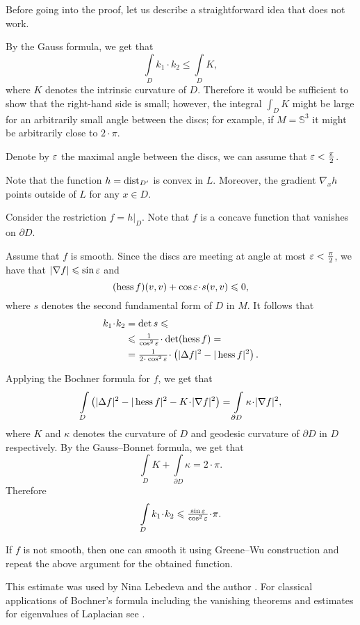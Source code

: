 Before going into the proof, let us describe a straightforward idea that does not work.

By the Gauss formula, we get that 
\[\int\limits_{D}k_1\cdot k_2\le\int\limits_{D}K,\] 
where $K$ denotes the intrinsic curvature of $D$.
Therefore it would be sufficient to show that the right-hand side is small;
however, the integral $\int_{D}K$ might be large for an arbitrarily small angle between the discs; for example, if $M=\mathbb{S}^3$ it might be arbitrarily close to $2\cdot \pi$.

\medskip

Denote by $\varepsilon$ the maximal angle between the discs, we can assume that $\varepsilon<\tfrac\pi2$.

Note that the function $h=\operatorname{\rm dist}\nolimits_{D'}$ is convex in $L$.
Moreover, the gradient $\nabla_xh$ points outside of $L$ for any $x\in D$. 

Consider the restriction $f=h|_D$.
Note that $f$ is a concave function that vanishes on $\partial D$.

Assume that $f$ is smooth.
Since the discs are meeting at angle at most $\varepsilon<\tfrac\pi2$,
we have that $|\nabla f|\leqslant \sin\varepsilon$ and 
\[(\Hess f)(v,v)+ \cos\eps \cdot s(v,v)\le 0,\]
where $s$ denotes the second fundamental form of $D$ in $M$.
It follows that
\begin{align*}
k_1\cdot k_2&=\det s\le
\\
&\le \tfrac1{\cos^2\eps}\cdot \det(\Hess f)=
\\
&=\tfrac1{2\cdot\cos^2\eps}\cdot\left(|\Delta f|^2
-|\Hess f|^2\right).
\end{align*}


Applying the Bochner formula for $f$, we get that
\[\int\limits_D \left(|\Delta f|^2
-|\Hess f|^2
-K\cdot|\nabla f|^2\right)
=\int\limits_{\partial D}
\kappa\cdot|\nabla f|^2,\]
where $K$ and $\kappa$ denotes the curvature of $D$ and geodesic curvature of $\partial D$ in $D$ respectively.
By the Gauss--Bonnet formula, we get that
\[\int\limits_D 
K+\int\limits_{\partial D}\kappa=2\cdot\pi.\]
Therefore
\[\int\limits_Dk_1\cdot k_2\le \tfrac{\sin \eps}{\cos^2\eps}\cdot\pi.\]

If $f$ is not smooth, then one can smooth it using Greene--Wu construction \cite[Theorem~2]{greene-wu} and repeat the above argument for the obtained function.
\qedsf

This estimate was used by Nina Lebedeva and the author \cite{lebedeva-petrunin-curvature}.
For classical applications of Bochner's formula including the vanishing theorems and estimates for eigenvalues of Laplacian see \cite[][II \S 8]{lawson-michelsohn}.

